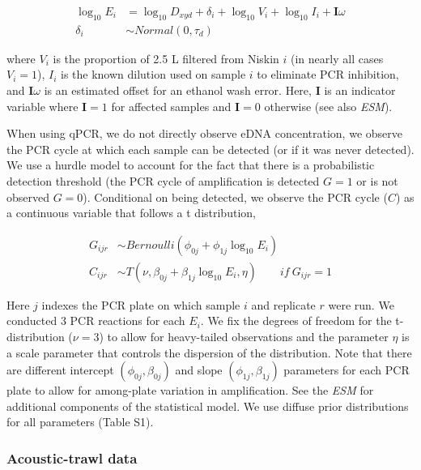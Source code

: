 \documentclass[
]{article}
\begin{document}
\begin{align}
  \log_{10}E_{i} &= \log_{10}D_{xyd} + \delta_i + \log_{10}{V_i} + \log_{10}{I_i}  + \mathbf{I}\omega\\
  \delta_i & \sim Normal(0,\tau_d)
\end{align} 

where \(V_i\) is the proportion of 2.5 L filtered from
Niskin \(i\) (in nearly all cases \(V_i = 1\)), \(I_i\) is the known
dilution used on sample \(i\) to eliminate PCR inhibition, and
\(\mathbf{I}\omega\) is an estimated offset for an ethanol wash error. 
Here, \(\mathbf{I}\) is an indicator variable where \(\mathbf{I}=1\) for affected samples and
\(\mathbf{I}=0\) otherwise (see also \emph{ESM}).

When using qPCR, we do not directly observe eDNA concentration, we
observe the PCR cycle at which each sample can be detected (or if it was
never detected). We use a hurdle model to account for the fact that
there is a probabilistic detection threshold (the PCR cycle of
amplification is detected \(G=1\) or is not observed \(G=0\)).
Conditional on being detected, we observe the PCR cycle (\(C\)) as a
continuous variable that follows a t distribution,

\begin{align}
  G_{ijr} &\sim Bernoulli(\phi_{0j}+\phi_{1j}\log_{10}E_{i})\\
  C_{ijr} &\sim T(\nu,\beta_{0j}+\beta_{1j}\log_{10}E_{i},\eta) \qquad  if \: G_{ijr} = 1
\end{align}

Here \(j\) indexes the PCR plate on which sample \(i\) and replicate
\(r\) were run. We conducted 3 PCR reactions for each \(E_i\). We fix
the degrees of freedom for the t-distribution (\(\nu = 3\)) to allow for
heavy-tailed observations and the parameter \( \eta \) is a scale parameter 
that controls the dispersion of the distribution. Note that there are different intercept
\((\phi_{0j},\beta_{0j})\) and slope \((\phi_{1j},\beta_{1j})\)
parameters for each PCR plate to allow for among-plate variation in
amplification. See the \emph{ESM} for additional components of the statistical model. 
We use diffuse prior distributions for all parameters (Table S1).

\hypertarget{acoustic-trawl-data}{%
\subsubsection{Acoustic-trawl data}\label{acoustic-trawl-data}}
\end{document}
